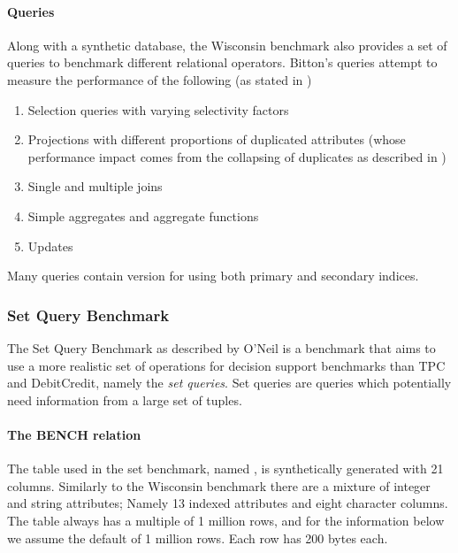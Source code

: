 \paragraph{Queries} Along with a synthetic database, the Wisconsin benchmark
also provides a set of queries to benchmark different relational operators.
Bitton's queries attempt to measure the performance of the following (as stated
in \cite{Wisconsin})
\begin{enumerate}
    \item Selection queries with varying selectivity factors
    \item Projections with different proportions of duplicated attributes (whose
        performance impact comes from the collapsing of duplicates as described
        in )
    \item Single and multiple joins
    \item Simple aggregates and aggregate functions
    \item Updates
\end{enumerate}
Many queries contain version for using both primary and secondary indices.

\subsubsection{Set Query Benchmark}
The Set Query Benchmark as described by O'Neil \cite{SetQueryBenchmark} is a
benchmark that aims to use a more realistic set of operations for decision
support benchmarks than TPC and DebitCredit, namely the \emph{set queries}. Set queries
are queries which potentially need information from a large set of tuples.

\paragraph{The BENCH relation} The table used in the set benchmark, named
, is synthetically generated with 21 columns. Similarly to the
Wisconsin benchmark there are a mixture of integer and string attributes; Namely
13 indexed attributes and eight character columns. The  table
always has a multiple of 1 million rows, and for the information below we assume
the default of 1 million rows. Each row has 200 bytes each.

